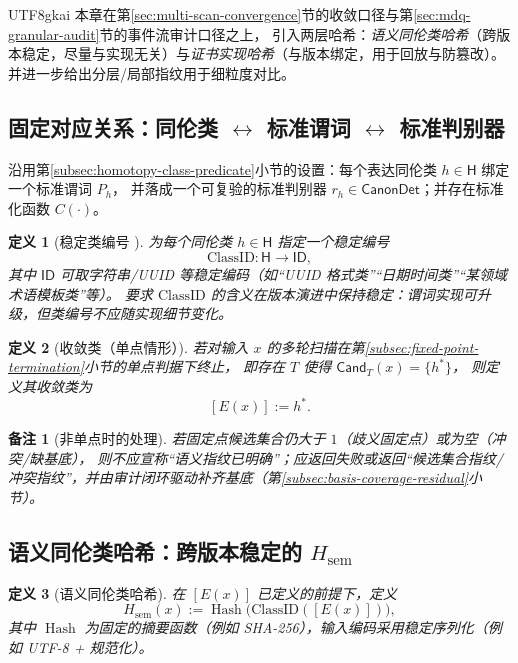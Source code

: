 \documentclass[12pt]{article}
\newtheorem{definition}{定义}[section]
\newtheorem{remark}{备注}[section]
\newcommand{\code}[1]{\path{#1}}
\begin{document}
\begin{CJK*}{UTF8}{gkai}
本章在第\ref{sec:multi-scan-convergence}节的收敛口径与第\ref{sec:mdq-granular-audit}节的事件流审计口径之上，
引入两层哈希：\emph{语义同伦类哈希}（跨版本稳定，尽量与实现无关）与\emph{证书实现哈希}（与版本绑定，用于回放与防篡改）。
并进一步给出分层/局部指纹用于细粒度对比。

\subsection{固定对应关系：同伦类 \texorpdfstring{$\leftrightarrow$}{<->} 标准谓词 \texorpdfstring{$\leftrightarrow$}{<->} 标准判别器}
\label{subsec:fingerprint-fixed-correspondence}

沿用第\ref{subsec:homotopy-class-predicate}小节的设置：每个表达同伦类 $h\in\mathsf{H}$ 绑定一个标准谓词 $P_h$，
并落成一个可复验的标准判别器 $r_h\in\mathsf{CanonDet}$；并存在标准化函数 $C(\cdot)$。

\begin{definition}[稳定类编号 \code{class_id}]
为每个同伦类 $h\in\mathsf{H}$ 指定一个稳定编号
\[
\mathrm{ClassID}:\mathsf{H}\to \mathsf{ID},
\]
其中 $\mathsf{ID}$ 可取字符串/UUID 等稳定编码（如“UUID 格式类”“日期时间类”“某领域术语模板类”等）。
要求 $\mathrm{ClassID}$ 的含义在版本演进中保持稳定：谓词实现可升级，但类编号不应随实现细节变化。
\end{definition}

\begin{definition}[收敛类（单点情形）]
若对输入 $x$ 的多轮扫描在第\ref{subsec:fixed-point-termination}小节的单点判据下终止，
即存在 $T$ 使得 $\mathsf{Cand}_T(x)=\{h^\ast\}$，
则定义其收敛类为
\[
[E(x)]:=h^\ast.
\]
\end{definition}

\begin{remark}[非单点时的处理]
若固定点候选集合仍大于 $1$（歧义固定点）或为空（冲突/缺基底），
则不应宣称“语义指纹已明确”；应返回失败或返回“候选集合指纹/冲突指纹”，并由审计闭环驱动补齐基底（第\ref{subsec:basis-coverage-residual}小节）。
\end{remark}

\subsection{语义同伦类哈希：跨版本稳定的 \texorpdfstring{$H_{\mathrm{sem}}$}{H_sem}}
\label{subsec:semantic-homotopy-hash}

\begin{definition}[语义同伦类哈希]
在 $[E(x)]$ 已定义的前提下，定义
\[
H_{\mathrm{sem}}(x):=\operatorname{Hash}\bigl(\mathrm{ClassID}([E(x)])\bigr),
\]
其中 $\operatorname{Hash}$ 为固定的摘要函数（例如 \textsf{SHA-256}\cite{fips180-4}），输入编码采用稳定序列化（例如 UTF-8 + 规范化）。
\end{definition}


\end{CJK*}
\end{document}

